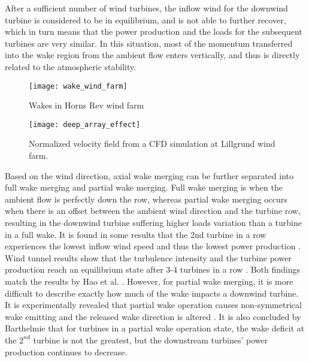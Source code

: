 \documentclass{umthesis}
\begin{document}
After a sufficient number of wind turbines, the inflow wind for the downwind turbine is considered to be in equilibrium, and is not able to further recover, which in turn means that the power production and the loads for the subsequent turbines are very similar. In this situation, most of the momentum transferred into the wake region from the ambient flow enters vertically, and thus is directly related to the atmospheric stability.

\begin{figure}
  \centering
  \texttt{[image: wake\_wind\_farm]}
  \caption{Wakes in Horns Rev wind farm}\label{fig:wake_wind_farm}
\end{figure}

\begin{figure}
  \centering
  \texttt{[image: deep\_array\_effect]}
  \caption{Normalized velocity field from a CFD simulation at Lillgrund wind farm.}\label{fig:deep_array_effect}
\end{figure}

Based on the wind direction, axial wake merging can be further separated into full wake merging and partial wake merging. Full wake merging is when the ambient flow is perfectly down the row, whereas partial wake merging occurs when there is an offset between the ambient wind direction and the turbine row, resulting in the downwind turbine suffering higher loads variation than a turbine in a full wake. It is found in some results that the 2nd turbine in a row experiences the lowest inflow wind speed and thus the lowest power production \cite{Schepers_2009}. Wind tunnel results show that the turbulence intensity and the turbine power production reach an equilibrium state after 3-4 turbines in a row \cite{Vermeulen_1982}. Both findings match the results by Hao et al. \cite{Hao}. However, for partial wake merging, it is more difficult to describe exactly how much of the wake impacts a downwind turbine. It is experimentally revealed that partial wake operation causes non-symmetrical wake emitting and the released wake direction is altered \cite{Troldborg_2011}. It is also concluded by Barthelmie \cite{Meteorological_controls} that for turbines in a partial wake operation state, the wake deficit at the $2^{nd}$ turbine is not the greatest, but the downstream turbines' power production continues to decrease.
\end{document}
